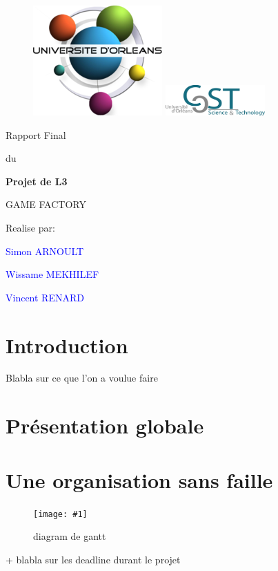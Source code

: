 \documentclass[french,12pt]{article}
\newcommand{\monimage}[4]{
\par\noindent
\begin{figure}[htp] %
\begin{center}
\texttt{[image: \#1]} %
\caption{#2} %
\label{#3} %
\end{center}
\end{figure} %
}
\newcommand{\ml}[0]{\par\noindent}
\begin{document}
\thispagestyle{empty}
%
\begin{figure}[H]
\includegraphics[width=0.2\linewidth]{logo_univ.png}
\hfill
\includegraphics[width=1.5in]{logo_ufr.png}
\end{figure}
\vspace{2cm}
%
\begin{center}
{\Huge Rapport Final}
\par\vspace{0.4cm}
{\Large du}
\par\vspace{0.cm}
{\Huge\bf Projet de L3}
\par\vspace{3cm}
{\Huge       GAME FACTORY}
\par\vspace{3cm}
{\Huge       Realise par:}
\par\vspace{0.3cm}
{\Huge\bf \textcolor{blue}{Simon ARNOULT \ml Wissame MEKHILEF \ml\ml Vincent RENARD}}
\end{center}
\newpage
\tableofcontents
\newpage


\section{Introduction}
Blabla sur ce que l'on a voulue faire


\section{Présentation globale}




\section{Une organisation sans faille}

\monimage{gantt.png}{diagram de gantt}{dg}{1}

+ blabla sur les deadline durant le projet
\end{document}
